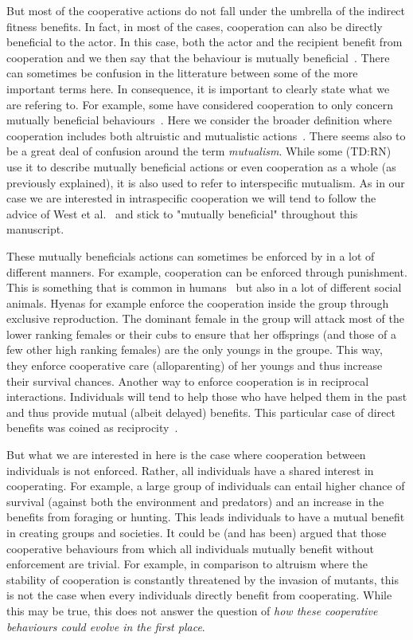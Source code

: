     But most of the cooperative actions do not fall under the umbrella of the indirect fitness benefits. In fact, in most of the cases, cooperation can also be directly beneficial to the actor. In this case, both the actor and the recipient benefit from cooperation and we then say that the behaviour is mutually beneficial~\cite{West2006}. There can sometimes be confusion in the litterature between some of the more important terms here. In consequence, it is important to clearly state what we are refering to. For example, some have considered cooperation to only concern mutually beneficial behaviours~\cite{Trivers1985, Keller2006}. Here we consider the broader definition where cooperation includes both altruistic and mutualistic actions~\cite{West2006}. There seems also to be a great deal of confusion around the term \emph{mutualism}. While some (TD:RN) use it to describe mutually beneficial actions or even cooperation as a whole (as previously explained), it is also used to refer to interspecific mutualism. As in our case we are interested in intraspecific cooperation we will tend to follow the advice of West et al.~\cite{West2006} and stick to "mutually beneficial" throughout this manuscript.

    These mutually beneficials actions can sometimes be enforced by in a lot of different manners. For example, cooperation can be enforced through punishment. This is something that is common in humans~\cite{Fehr2002} but also in a lot of different social animals. Hyenas for example enforce the cooperation inside the group through exclusive reproduction. The dominant female in the group will attack most of the lower ranking females or their cubs to ensure that her offsprings (and those of a few other high ranking females) are the only youngs in the groupe. This way, they enforce cooperative care (alloparenting) of her youngs and thus increase their survival chances. Another way to enforce cooperation is in reciprocal interactions. Individuals will tend to help those who have helped them in the past and thus provide mutual (albeit delayed) benefits. This particular case of direct benefits was coined as reciprocity~\cite{Trivers1971, Keller2006}.


    But what we are interested in here is the case where cooperation between individuals is not enforced. Rather, all individuals have a shared interest in cooperating. For example, a large group of individuals can entail higher chance of survival (against both the environment and predators) and an increase in the benefits from foraging or hunting. This leads individuals to have a mutual benefit in creating groups and societies. It could be (and has been) argued that those cooperative behaviours from which all individuals mutually benefit without enforcement are trivial. For example, in comparison to altruism where the stability of cooperation is constantly threatened by the invasion of mutants, this is not the case when every individuals directly benefit from cooperating. While this may be true, this does not answer the question of \emph{how these cooperative behaviours could evolve in the first place}.

